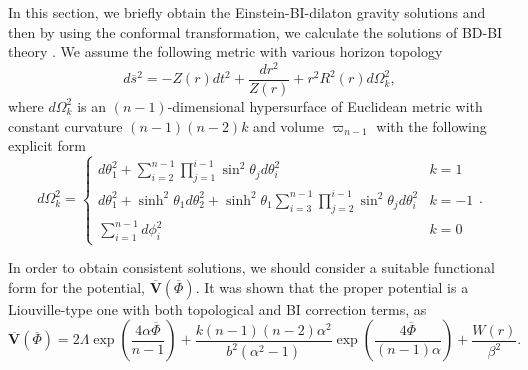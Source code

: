 \documentclass[aps,onecolumn ]{revtex4}
\begin{document}
In this section, we briefly obtain the Einstein-BI-dilaton gravity
solutions and then by using the conformal transformation, we
calculate the solutions of BD-BI theory \cite{HMAT}. We assume the
following metric with various horizon topology
\begin{equation}
d\overline{s}^{2}=-Z(r)dt^{2}+\frac{dr^{2}}{Z(r)}+r^{2}R^{2}(r)d\Omega
_{k}^{2},  \label{metric}
\end{equation}
where $d\Omega_{k}^{2}$ is an $(n-1)$-dimensional hypersurface of Euclidean
metric with constant curvature $(n-1)(n-2)k$ and volume $\varpi_{n-1}$ with
the following explicit form
\begin{equation}
d\Omega _{k}^{2}=\left\{
\begin{array}{cc}
d\theta _{1}^{2}+\sum\limits_{i=2}^{n-1}\prod\limits_{j=1}^{i-1}\sin
^{2}\theta _{j}d\theta _{i}^{2} & k=1 \\
d\theta _{1}^{2}+\sinh ^{2}\theta _{1}d\theta _{2}^{2}+\sinh ^{2}\theta
_{1}\sum\limits_{i=3}^{n-1}\prod\limits_{j=2}^{i-1}\sin ^{2}\theta
_{j}d\theta _{i}^{2} & k=-1 \\
\sum\limits_{i=1}^{n-1}d\phi _{i}^{2} & k=0%
\end{array}
\right. .  \label{k}
\end{equation}

In order to obtain consistent solutions, we should consider a
suitable functional form for the potential,
$\mathbf{\overline{V}}(\overline{\Phi})$. It was shown that the
proper potential is a Liouville-type one with both topological and
BI correction terms, as \cite{BDvsDilaton}
\begin{equation}
\mathbf{\overline{V}}(\overline{\Phi })=2\Lambda \exp \left( \frac{4\alpha
\overline{\Phi }}{n-1}\right) +\frac{k(n-1)(n-2)\alpha ^{2}}{b^{2}\left(
\alpha ^{2}-1\right) }\exp \left( \frac{4\overline{\Phi }}{(n-1)\alpha }%
\right) +\frac{W(r)}{\beta ^{2}}.  \label{liovilpoten}
\end{equation}
\end{document}
